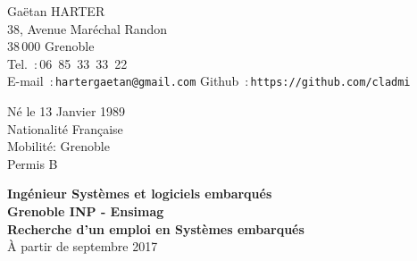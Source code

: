 \documentclass{cv}
\begin{document}
\begin{chapeau}
\hspace{1cm}
\begin{adresse}
        Gaëtan HARTER\\
        38, Avenue Maréchal Randon\\
        38\,000 Grenoble\\
        \vspace{3pt}
        Tel.~:\,06~85~33~33~22\\
        E-mail~:\,\texttt{hartergaetan@gmail.com}
        Github~:\,\texttt{https://github.com/cladmi}
\end{adresse}
\begin{etatcivil}
        Né le 13 Janvier 1989\\
        Nationalité Française\\
        Mobilité: Grenoble\\
        Permis B
\end{etatcivil}
\hspace{0.5cm}
\end{chapeau}
\vspace{0.5cm}
\begin{center}
        \textbf{\Large Ingénieur Systèmes et logiciels embarqués\\}
        \textbf{\large Grenoble INP - Ensimag\\}
        \vspace{0.5em}
        \textbf{\large Recherche d'un emploi en Systèmes embarqués\\} %
        {À partir de septembre 2017}
\end{center}



\end{document}
